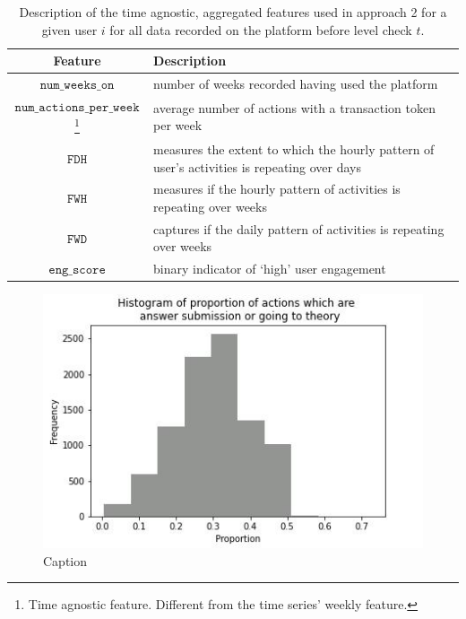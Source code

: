 \documentclass[sigplan,screen]{acmart}
\begin{document}
\begin{table}[!ht]
  \caption{Description of the time agnostic, aggregated features used in approach 2 for a given user $i$ for all data recorded on the platform before level check $t$.}
  \label{tab:A2features}
  \begin{tabular}{cl}
    \toprule
    \textbf{Feature}&\textbf{Description}\\
    \midrule
    $\texttt{num\_weeks\_on}$ & number of weeks recorded having used the platform\\
    $\texttt{num\_actions\_per\_week}$\footnote{Time agnostic feature. Different from the time series' weekly feature.} & average number of actions with a transaction token per week\\
    $\texttt{FDH}$ & measures the extent to which the hourly pattern of user’s activities is repeating over days \\
    $\texttt{FWH}$ & measures if the hourly pattern of activities is repeating over weeks\\
    $\texttt{FWD}$ & captures if the daily pattern of activities is repeating over weeks\\
    $\texttt{eng\_score}$ & binary indicator of `high' user engagement\\
    \bottomrule
    \end{tabular}
\end{table}

\begin{figure}
    \centering
    \includegraphics[width=\linewidth]{reports/figures/eng_score_hist.jpg}
    \caption{Caption}
    \label{fig:eng_score}
\end{figure}
\end{document}
